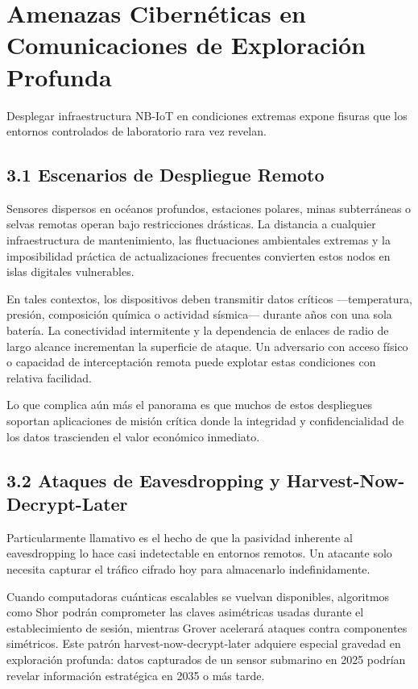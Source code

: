 \section{Amenazas Cibernéticas en Comunicaciones de Exploración Profunda}

Desplegar infraestructura NB-IoT en condiciones extremas expone fisuras que los entornos controlados de laboratorio rara vez revelan.

\subsection{3.1 Escenarios de Despliegue Remoto}

Sensores dispersos en océanos profundos, estaciones polares, minas subterráneas o selvas remotas operan bajo restricciones drásticas. La distancia a cualquier infraestructura de mantenimiento, las fluctuaciones ambientales extremas y la imposibilidad práctica de actualizaciones frecuentes convierten estos nodos en islas digitales vulnerables. 

En tales contextos, los dispositivos deben transmitir datos críticos —temperatura, presión, composición química o actividad sísmica— durante años con una sola batería. La conectividad intermitente y la dependencia de enlaces de radio de largo alcance incrementan la superficie de ataque. Un adversario con acceso físico o capacidad de interceptación remota puede explotar estas condiciones con relativa facilidad. 

Lo que complica aún más el panorama es que muchos de estos despliegues soportan aplicaciones de misión crítica donde la integridad y confidencialidad de los datos trascienden el valor económico inmediato.

\subsection{3.2 Ataques de Eavesdropping y Harvest-Now-Decrypt-Later}

Particularmente llamativo es el hecho de que la pasividad inherente al eavesdropping lo hace casi indetectable en entornos remotos. Un atacante solo necesita capturar el tráfico cifrado hoy para almacenarlo indefinidamente. 

Cuando computadoras cuánticas escalables se vuelvan disponibles, algoritmos como Shor podrán comprometer las claves asimétricas usadas durante el establecimiento de sesión, mientras Grover acelerará ataques contra componentes simétricos. Este patrón harvest-now-decrypt-later adquiere especial gravedad en exploración profunda: datos capturados de un sensor submarino en 2025 podrían revelar información estratégica en 2035 o más tarde.


